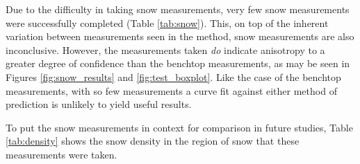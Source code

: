 Due to the difficulty in taking snow measurements, very few snow measurements were
successfully completed (Table \ref{tab:snow}). This, on top of the inherent variation between measurements seen in the method, snow measurements are also inconclusive. However, the
measurements taken \emph{do} indicate anisotropy to a greater degree of confidence
than the benchtop measurements, as may be seen in Figures \ref{fig:snow_results}
 and \ref{fig:test_boxplot}. Like the case of the benchtop measurements, with so few
measurements a curve fit against either method of prediction is unlikely to
yield useful results.

To put the snow measurements in context for comparison in future studies, Table
\ref{tab:density} shows the snow density in the region of snow
that these measurements were taken.
